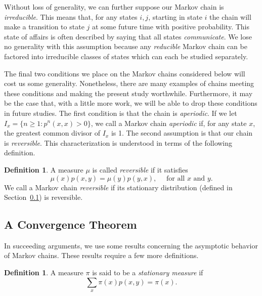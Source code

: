 \documentclass[12pt,letterpaper]{report}
\theoremstyle{plain}
\theoremstyle{definition}
\newtheorem{definition}[theorem]{Definition}
\theoremstyle{remark}
\numberwithin{theorem}{chapter}
\numberwithin{claim}{chapter}
\numberwithin{equation}{chapter}
\numberwithin{conjecture}{chapter}
\newcommand\<{\ensuremath{\langle}}
\renewcommand\>{\ensuremath{\rangle}}
\begin{document}
Without loss of generality, we can further suppose our Markov chain is \emph{irreducible}. This
means that, for any states $i, j$, starting in state $i$ the chain will make a
transition to state $j$ at some future time with positive probability. This
state of affairs is often described by saying that all states \emph{communicate}. We
lose no generality with this assumption because any \emph{reducible} Markov chain can
be factored into irreducible classes of states which can each be studied
separately. 

The final two conditions we place on the Markov chains considered below will cost us
some generality. Nonetheless, there are many examples of chains meeting these conditions
and making the present study worthwhile. Furthermore, it may be the case that, with a little
more work, we will be able to drop these conditions in future studies. The first condition is that
the chain is \emph{aperiodic}. If we let $I_x = \{n \geq 1: p^n(x,x) > 0\}$, we
call a Markov chain \emph{aperiodic} if, for any state $x$, the greatest common
divisor of $I_x$ is 1. The second assumption is that our chain is 
\emph{reversible}. This characterization is understood in terms of the following definition.

\begin{definition}
\label{def:2.1.3}
A measure $\mu$ is called \emph{reversible} if it satisfies
\[
\mu(x)p(x,y) = \mu(y)p(y,x), \quad  \text{ for all $x$ and $y$.}
\]
We call a Markov chain \emph{reversible} if its stationary distribution (defined
in Section~\ref{sec:convergence-theorem}) is reversible. 
\end{definition}




\subsection{A Convergence Theorem}
\label{sec:convergence-theorem}
In succeeding arguments, we use some results concerning the asymptotic behavior of
Markov chains. These results require a few more definitions.

\begin{definition}
\label{def:2.1.4}
A measure $\pi$ is said to be a \emph{stationary measure} if
\begin{equation}
  \label{eq:2.4}
\sum_x \pi(x) p(x,y) = \pi(x).
\end{equation}
\end{definition}
\end{document}
